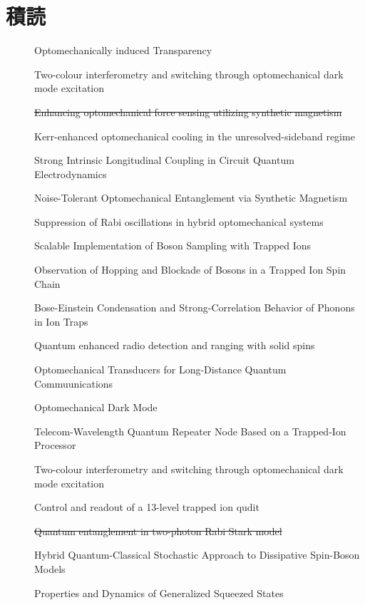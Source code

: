 \documentclass{report}
\begin{document}
  \chapter*{積読}
    \begin{description}
      \item[\cite{science.1195596}] Optomechanically induced Transparency
      \item[\cite{lake2020two}] Two-colour interferometry and switching through optomechanical dark mode excitation
      \item[\cite{PhysRevA.111.053508}] \sout{Enhancing optomechanical force sensing utilizing synthetic magnetism}
      \item[\cite{PhysRevA.111.053505}] Kerr-enhanced optomechanical cooling in the unresolved-sideband regime
      \item[\cite{PhysRevLett.134.153603}] Strong Intrinsic Longitudinal Coupling in Circuit Quantum Electrodynamics
      \item[\cite{PhysRevLett.129.063602}] Noise-Tolerant Optomechanical Entanglement via Synthetic Magnetism
      \item[\cite{PhysRevA.92.043822}] Suppression of Rabi oscillations in hybrid optomechanical systems
      \item[\cite{PhysRevLett.112.050504}] Scalable Implementation of Boson Sampling with Trapped Ions
      \item[\cite{PhysRevLett.120.073001}] Observation of Hopping and Blockade of Bosons in a Trapped Ion Spin Chain
      \item[\cite{PhysRevLett.93.263602}] Bose-Einstein Condensation and Strong-Correlation Behavior of Phonons in Ion Traps
      \item[\cite{chen2023quantum}] Quantum enhanced radio detection and ranging with solid spins
      \item[\cite{PhysRevLett.105.220501}] Optomechanical Transducers for Long-Distance Quantum Commuunications
      \item[\cite{science.1228370}] Optomechanical Dark Mode
      \item[\cite{PhysRevLett.130.213601}] Telecom-Wavelength Quantum Repeater Node Based on a Trapped-Ion Processor
      \item[\cite{lake2020two}] Two-colour interferometry and switching through optomechanical dark mode excitation
      \item[\cite{low2025control}] Control and readout of a 13-level trapped ion qudit 
      \item[\cite{boutakka2025quantum}] \sout{Quantum entanglement in two-photon Rabi Stark model}
      \item[\cite{PhysRevX.15.021073}] Hybrid Quantum-Classical Stochastic Approach to Dissipative Spin-Boson Models
      \item[\cite{ashhabPropertiesDynamicsGeneralized2025b}] Properties and Dynamics of Generalized Squeezed States
    \end{description}
  \printbibliography
\end{document}
